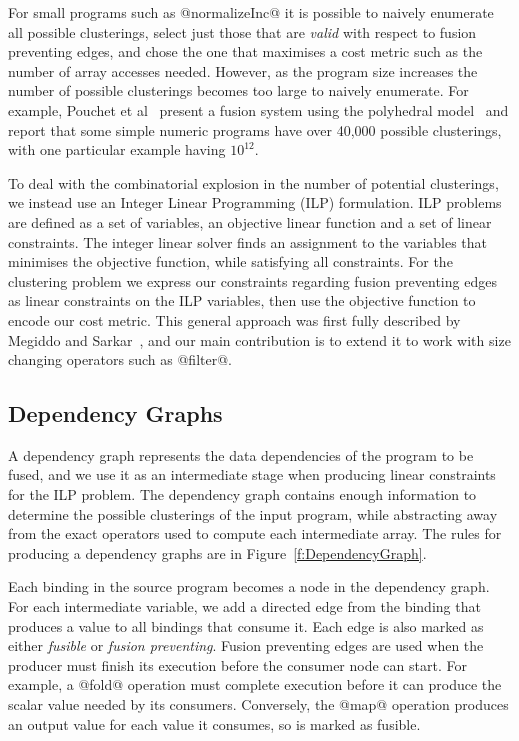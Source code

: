 For small programs such as @normalizeInc@ it is possible to naively enumerate all possible clusterings, select just those that are \emph{valid} with respect to fusion preventing edges, and chose the one that maximises a cost metric such as the number of array accesses needed. However, as the program size increases the number of possible clusterings becomes too large to naively enumerate. For example, Pouchet et al~\cite{pouchet2010combined} present a fusion system using the polyhedral model~\cite{pouchet2011polyhedral} and report that some simple numeric programs have over 40,000 possible clusterings, with one particular example having $10^{12}$. 

To deal with the combinatorial explosion in the number of potential clusterings, we instead use an Integer Linear Programming (ILP) formulation. ILP problems are defined as a set of variables, an objective linear function and a set of linear constraints. The integer linear solver finds an assignment to the variables that minimises the objective function, while satisfying all constraints. For the clustering problem we express our constraints regarding fusion preventing edges as linear constraints on the ILP variables, then use the objective function to encode our cost metric. This general approach was first fully described by Megiddo and Sarkar~\cite{megiddo1998optimal}, and our main contribution is to extend it to work with size changing operators such as @filter@. 


\subsection{Dependency Graphs}
A dependency graph represents the data dependencies of the program to be fused, and we use it as an intermediate stage when producing linear constraints for the ILP problem. The dependency graph contains enough information to determine the possible clusterings of the input program, while abstracting away from the exact operators used to compute each intermediate array. The rules for producing a dependency graphs are in Figure~\ref{f:DependencyGraph}.

Each binding in the source program becomes a node in the dependency graph. For each intermediate variable, we add a directed edge from the binding that produces a value to all bindings that consume it. Each edge is also marked as either \emph{fusible} or \emph{fusion preventing}. Fusion preventing edges are used when the producer must finish its execution before the consumer node can start. For example, a @fold@ operation must complete execution before it can produce the scalar value needed by its consumers. Conversely, the @map@ operation produces an output value for each value it consumes, so is marked as fusible. 

